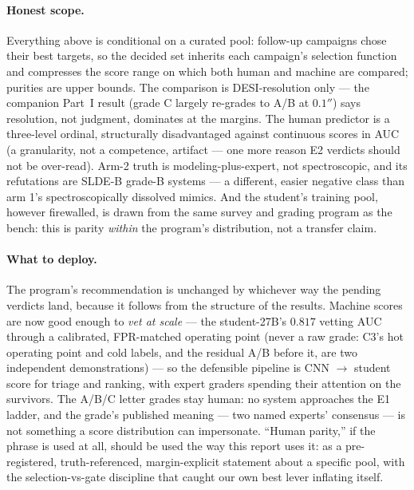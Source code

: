 \documentclass[11pt,letterpaper]{article}
\begin{document}
\paragraph{Honest scope.} Everything above is conditional on a curated pool:
follow-up campaigns chose their best targets, so the decided set inherits each
campaign's selection function and compresses the score range on which both human and
machine are compared; purities are upper bounds. The comparison is DESI-resolution
only --- the companion Part~I result (grade C largely re-grades to A/B at $0.1''$)
says resolution, not judgment, dominates at the margins. The human predictor is a
three-level ordinal, structurally disadvantaged against continuous scores in AUC
(a granularity, not a competence, artifact --- one more reason E2 verdicts should not
be over-read). Arm-2 truth is modeling-plus-expert, not spectroscopic, and its
refutations are SLDE-B grade-B systems --- a different, easier negative class than
arm 1's spectroscopically dissolved mimics. And the student's training pool, however
firewalled, is drawn from the same survey and grading program as the bench: this is
parity \emph{within} the program's distribution, not a transfer claim.

\paragraph{What to deploy.} The program's recommendation is unchanged by whichever way
the pending verdicts land, because it follows from the structure of the results.
Machine scores are now good enough to \emph{vet at scale} --- the student-27B's
$0.817$ vetting AUC through a calibrated, FPR-matched operating point (never a raw
grade: C3's hot operating point and cold labels, and the residual A/B before it, are
two independent demonstrations) --- so the defensible pipeline is CNN $\to$ student
score for triage and ranking, with expert graders spending their attention on the
survivors. The A/B/C letter grades stay human: no system approaches the E1 ladder, and
the grade's published meaning --- two named experts' consensus --- is not something a
score distribution can impersonate. ``Human parity,'' if the phrase is used at all,
should be used the way this report uses it: as a pre-registered, truth-referenced,
margin-explicit statement about a specific pool, with the selection-vs-gate discipline
that caught our own best lever inflating itself.
\end{document}
